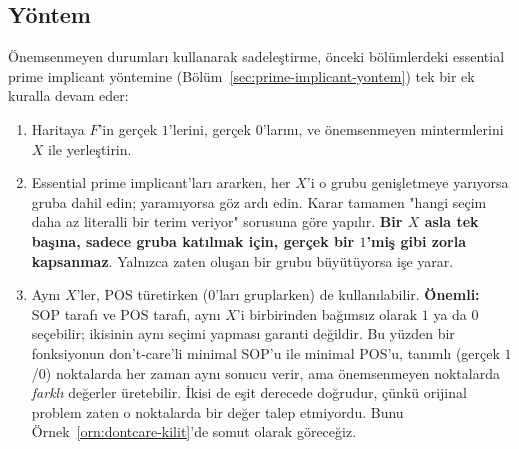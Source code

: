 \subsection{Yöntem}\label{sec:dont-care-yontem}
Önemsenmeyen durumları kullanarak sadeleştirme, önceki bölümlerdeki essential
prime implicant yöntemine (Bölüm~\ref{sec:prime-implicant-yontem}) tek bir
ek kuralla devam eder:
\begin{enumerate}[nosep, leftmargin=*]
    \item Haritaya $F$'in gerçek $1$'lerini, gerçek $0$'larını, ve önemsenmeyen
    mintermlerini $X$ ile yerleştirin.
    \item Essential prime implicant'ları ararken, her $X$'i o grubu genişletmeye
    yarıyorsa gruba dahil edin; yaramıyorsa göz ardı edin. Karar tamamen "hangi
    seçim daha az literalli bir terim veriyor" sorusuna göre yapılır. \textbf{Bir
    $X$ asla tek başına, sadece gruba katılmak için, gerçek bir $1$'miş gibi
    zorla kapsanmaz}. Yalnızca zaten oluşan bir grubu büyütüyorsa işe yarar.
    \item Aynı $X$'ler, POS türetirken ($0$'ları gruplarken) de kullanılabilir.
    \textbf{Önemli:} SOP tarafı ve POS tarafı, aynı $X$'i birbirinden bağımsız
    olarak $1$ ya da $0$ seçebilir; ikisinin aynı seçimi yapması garanti
    değildir. Bu yüzden bir fonksiyonun don't-care'li minimal SOP'u ile minimal
    POS'u, tanımlı (gerçek $1$/$0$) noktalarda her zaman aynı sonucu verir, ama
    önemsenmeyen noktalarda \emph{farklı} değerler üretebilir. İkisi de
    eşit derecede doğrudur, çünkü orijinal problem zaten o noktalarda bir değer
    talep etmiyordu. Bunu Örnek~\ref{orn:dontcare-kilit}'de somut olarak
    göreceğiz.
\end{enumerate}

